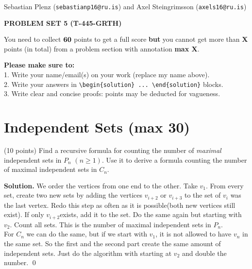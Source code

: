 \documentclass[a4paper,11pt]{amsart}
\newcounter{temp}
\newcounter{prob_counter}
\newenvironment{problem}
{\begin{list}{{\bf \arabic{prob_counter}}}{
      \usecounter{prob_counter}
      \addtolength{\labelsep}{.6ex}
      \addtolength{\itemsep}{4.3ex}
      \setlength{\leftmargin}{1.4em}}
      \setcounter{prob_counter}{\value{temp}}
}
{\setcounter{temp}{\value{prob_counter}}  
  \end{list}
}
\newenvironment{solution}{\textbf{Solution.}}{\qed}
\newcommand{\rubrik}[1]{\bigskip \begin{center}{\bf #1}\end{center} \medskip}
\begin{document}
\pagestyle{empty}
\thispagestyle{empty}

{\small{\sc\noindent
        Sebastian Plenz ({\tt sebastianp16@ru.is}) and Axel Steingrimsson ({\tt axels16@ru.is})
}}

\rubrik{PROBLEM SET 5 (T-445-GRTH)}

You need to collect $\bf 60$ points to get a full score {\bf but} you cannot get more than {\bf X} points (in total) from a problem section with annotation {\bf max X}.

{\bf Please make sure to:}\\
1. Write your name/email(s) on your work (replace my name above).\\
2. Write your answers in \texttt{{\textbackslash}begin\{solution\} ... {\textbackslash}end\{solution\}} blocks.\\
3. Write clear and concise proofs: points may be deducted for vagueness.




\section{Independent Sets ({\bf max 30})}

\begin{problem}
 \item (10 points) Find a recursive formula for counting the number of \emph{maximal} independent sets in $P_n$ $(n\ge 1)$. Use it to derive a formula counting the number of maximal independent sets in $C_n$. 
\end{problem}

\begin{solution}
	We order the vertices from one end to the other. Take $v_1$. From every set, create two new sets by adding the vertices $v_{i+2}$ or $v_{i+3}$ to the set of $v_i$ was the last vertex. Redo this step as often as it is possible(both new vertices still exist). If only $v_{i+2}$exists, add it to the set. Do the same again but starting with $v_2$. Count all sets. This is the number of maximal independent sets in $P_n$. \\
	For $C_n$ we can do the same, but if we start with $v_1$, it is not allowed to have $v_n$ in the same set. So the first and the second part create the same amount of independent sets. Just do the algorithm with starting at $v_2$ and double the number. 
\end{solution}
\end{document}
